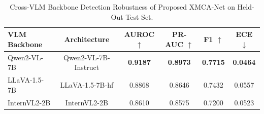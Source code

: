 \begin{table}[t]
\centering
\small
\caption{Cross-VLM Backbone Detection Robustness of Proposed XMCA-Net on Held-Out Test Set.}
\label{tab:vlm_comparison}
\begin{tabular}{lccccc}
\toprule
\textbf{VLM Backbone} & \textbf{Architecture} & \textbf{AUROC} $\uparrow$ & \textbf{PR-AUC} $\uparrow$ & \textbf{F1} $\uparrow$ & \textbf{ECE} $\downarrow$ \\
\midrule
Qwen2-VL-7B & Qwen2-VL-7B-Instruct & \textbf{0.9187} & \textbf{0.8973} & \textbf{0.7715} & \textbf{0.0464} \\
LLaVA-1.5-7B & LLaVA-1.5-7B-hf & 0.8868 & 0.8646 & 0.7432 & 0.0557 \\
InternVL2-2B & InternVL2-2B & 0.8610 & 0.8575 & 0.7200 & 0.0523 \\
\bottomrule
\end{tabular}
\end{table}